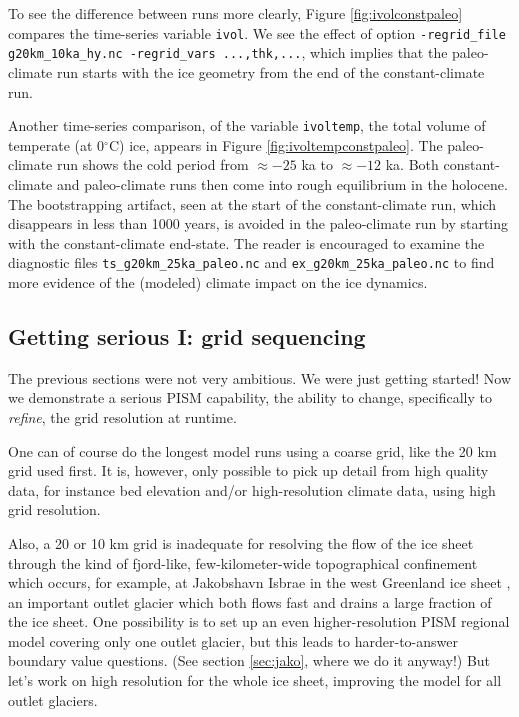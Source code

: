 To see the difference between runs more clearly, Figure \ref{fig:ivolconstpaleo} compares the time-series variable \texttt{ivol}.  We see the effect of option \verb|-regrid_file g20km_10ka_hy.nc -regrid_vars ...,thk,...|, which implies that the paleo-climate run starts with the ice geometry from the end of the constant-climate run.

Another time-series comparison, of the variable \verb|ivoltemp|, the total volume of temperate (at 0$^\circ$C) ice, appears in Figure \ref{fig:ivoltempconstpaleo}.  The paleo-climate run shows the cold period from $\approx -25$ ka to $\approx -12$ ka.  Both constant-climate and paleo-climate runs then come into rough equilibrium in the holocene.  The bootstrapping artifact, seen at the start of the constant-climate run, which disappears in less than 1000 years, is avoided in the paleo-climate run by starting with the constant-climate end-state.  The reader is encouraged to examine the diagnostic files \texttt{ts_g20km_25ka_paleo.nc} and \texttt{ex_g20km_25ka_paleo.nc} to find more evidence of the (modeled) climate impact on the ice dynamics.


\subsection{Getting serious I: grid sequencing}  \label{subsect:gridseq}  

The previous sections were not very ambitious.  We were just getting started!  Now we demonstrate a serious PISM capability, the ability to change, specifically to \emph{refine}, the grid resolution at runtime.

One can of course do the longest model runs using a coarse grid, like the 20 km grid used first.  It is, however, only possible to pick up detail from high quality data, for instance bed elevation and/or high-resolution climate data, using high grid resolution.

Also, a 20 or 10 km grid is inadequate for resolving the flow of the ice sheet through the kind of fjord-like, few-kilometer-wide topographical confinement which occurs, for example, at Jakobshavn Isbrae in the west Greenland ice sheet \cite{Joughinetal08}, an important outlet glacier which both flows fast and drains a large fraction of the ice sheet.  One possibility is to set up an even higher-resolution PISM regional model covering only one outlet glacier, but this leads to harder-to-answer boundary value questions.  (See section \ref{sec:jako}, where we do it anyway!)  But let's work on high resolution for the whole ice sheet, improving the model for all outlet glaciers.

